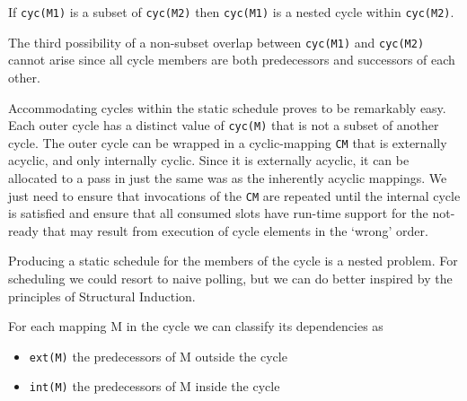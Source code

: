 \documentclass{jot}
\begin{document}
If \verb|cyc(M1)| is a subset of \verb|cyc(M2)| then \verb|cyc(M1)| is a nested cycle within \verb|cyc(M2)|.

The third possibility of a non-subset overlap between \verb|cyc(M1)| and \verb|cyc(M2)| cannot arise since all cycle members are both predecessors and successors of each other.

Accommodating cycles within the static schedule proves to be remarkably easy. Each outer cycle has a distinct value of \verb|cyc(M)| that is not a subset of another cycle. The outer cycle can be wrapped in a cyclic-mapping \verb|CM| that is externally acyclic, and only internally cyclic. Since it is externally acyclic, it can be allocated to a pass in just the same was as the inherently acyclic mappings. We just need to ensure that invocations of the \verb|CM| are repeated until the internal cycle is satisfied and ensure that all consumed slots have run-time support for the not-ready that may result from execution of cycle elements in the `wrong' order.

Producing a static schedule for the members of the cycle is a nested problem. For scheduling we could resort to naive polling, but we can do better inspired by the principles of Structural Induction.



For each mapping M in the cycle we can classify its dependencies as
\begin{itemize}
	\item \verb|ext(M)| the predecessors of M outside the cycle
	\item \verb|int(M)| the predecessors of M inside the cycle
\end{itemize}
\end{document}

